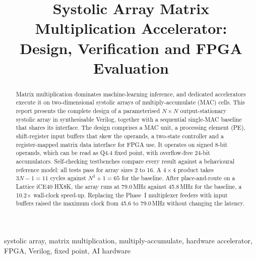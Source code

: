 \documentclass[conference]{IEEEtran}
\begin{document}
\title{Systolic Array Matrix Multiplication Accelerator:\\Design, Verification and FPGA Evaluation}

\author{
}

\maketitle

\begin{abstract}
Matrix multiplication dominates machine-learning inference, and dedicated
accelerators execute it on two-dimensional systolic arrays of
multiply-accumulate (MAC) cells. This report presents the complete design of a
parameterised $N \times N$ output-stationary systolic array in synthesisable
Verilog, together with a sequential single-MAC baseline that shares its
interface. The design comprises a MAC unit, a processing element (PE),
shift-register input buffers that skew the operands, a two-state controller and
a register-mapped matrix data interface for FPGA use. It operates on signed
8-bit operands, which can be read as Q4.4 fixed point, with overflow-free 24-bit
accumulators. Self-checking testbenches compare every result against a
behavioural reference model: all tests pass for array sizes 2 to 16. A $4\times4$
product takes $3N-1 = 11$ cycles against $N^3+1 = 65$ for the baseline. After
place-and-route on a Lattice iCE40 HX8K, the array runs at 79.0\,MHz against
45.8\,MHz for the baseline, a 10.2$\times$ wall-clock speed-up. Replacing the
Phase~I multiplexer feeders with input buffers raised the maximum clock from
45.6 to 79.0\,MHz without changing the latency.
\end{abstract}

\begin{IEEEkeywords}
systolic array, matrix multiplication, multiply-accumulate, hardware
accelerator, FPGA, Verilog, fixed point, AI hardware
\end{IEEEkeywords}
\end{document}
